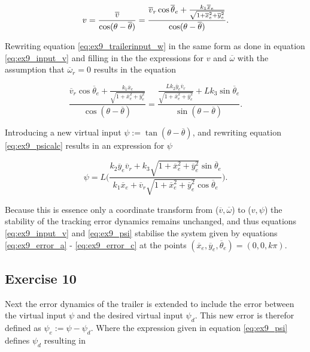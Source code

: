 \begin{equation}
    v = \frac{\overline{v}}{\cos(\theta-\overline{\theta})} = \frac{\overline{v}_r\cos\overline{\theta}_e + \frac{k_1\overline{x}_e}{\sqrt{1+\overline{x}^2_e+\overline{y}^2_e}}}{\cos(\theta-\overline{\theta})}. \label{eq:ex9_input_v}\\
\end{equation}

Rewriting equation \eqref{eq:ex9_trailerinput_w} in the same form as done in equation \eqref{eq:ex9_input_v} and filling in the the expressions for $v$ and $\overline{\omega}$ with the assumption that $\overline{\omega}_r = 0$ results in the equation

\begin{equation}
    \frac{\overline{v}_r\cos\overline{\theta}_e + \frac{k_1\overline{x}_e}{\sqrt{1+\overline{x}^2_e+\overline{y}^2_e}}}{\cos(\theta-\overline{\theta})} = \frac{\frac{L k_2 \overline{y}_e \overline{v}_r}{\sqrt{1+\overline{x}^2_e+\overline{y}^2_e}} + L k_3 \sin\overline{\theta}_e}{\sin(\theta-\overline{\theta})}. \label{eq:ex9_psicalc}
\end{equation}

Introducing a new virtual input $\psi := \tan(\theta-\overline{\theta})$, and rewriting equation \eqref{eq:ex9_psicalc} results in an expression for $\psi$

\begin{equation}
    \psi = L \Big( \frac{k_2\overline{y}_e\overline{v}_r + k_3 \sqrt{1+\overline{x}_e^2+\overline{y}_e^2}\sin\overline{\theta}_e}{k_1\overline{x}_e + \overline{v}_r\sqrt{1+\overline{x}_e^2+\overline{y}_e^2}\cos\overline{\theta}_e} \Big). \label{eq:ex9_psi}
\end{equation}

Because this is essence only a coordinate transform from ($\overline{v}, \overline{\omega}$) to ($v, \psi$) the stability of the tracking error dynamics remains unchanged, and thus equations \eqref{eq:ex9_input_v} and \eqref{eq:ex9_psi} stabilise the system given by equations \eqref{eq:ex9_error_a} - \eqref{eq:ex9_error_c} at the points $(\overline{x}_e,\overline{y}_e,\overline{\theta}_e) = (0,0,k\pi)$.



\subsection{Exercise 10}
Next the error dynamics of the trailer is extended to include the error between the virtual input $\psi$ and the desired virtual input $\psi_d$. This new error is therefor defined as $\psi_e := \psi - \psi_d$. Where the expression given in equation \eqref{eq:ex9_psi} defines $\psi_d$ resulting in


